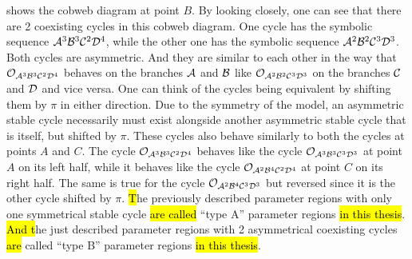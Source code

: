  shows the cobweb diagram at point $B$.
By looking closely, one can see that there are 2 coexisting cycles in this cobweb diagram.
One cycle has the symbolic sequence $\mathcal{A}^3\mathcal{B}^3\mathcal{C}^2\mathcal{D}^4$, while the other one has the symbolic sequence $\mathcal{A}^2\mathcal{B}^2\mathcal{C}^3\mathcal{D}^3$.
Both cycles are asymmetric.
And they are similar to each other in the way that $\mathcal{O}_{\mathcal{A}^3\mathcal{B}^3\mathcal{C}^2\mathcal{D}^4}$ behaves on the branches $\mathcal{A}$ and $\mathcal{B}$ like $\mathcal{O}_{\mathcal{A}^2\mathcal{B}^2\mathcal{C}^3\mathcal{D}^3}$ on the branches $\mathcal{C}$ and $\mathcal{D}$ and vice versa.
One can think of the cycles being equivalent by shifting them by $\pi$ in either direction.
Due to the symmetry of the model, an asymmetric stable cycle necessarily must exist alongside another asymmetric stable cycle that is itself, but shifted by $\pi$.
These cycles also behave similarly to both the cycles at points $A$ and $C$.
The cycle $\mathcal{O}_{\mathcal{A}^3\mathcal{B}^3\mathcal{C}^2\mathcal{D}^4}$ behaves like the cycle $\mathcal{O}_{\mathcal{A}^3\mathcal{B}^3\mathcal{C}^3\mathcal{D}^3}$ at point $A$ on its left half, while it behaves like the cycle $\mathcal{O}_{\mathcal{A}^2\mathcal{B}^4\mathcal{C}^2\mathcal{D}^4}$ at point $C$ on its right half.
The same is true for the cycle $\mathcal{O}_{\mathcal{A}^2\mathcal{B}^4\mathcal{C}^3\mathcal{D}^3}$ but reversed since it is the other cycle shifted by $\pi$.
\hl{T}he previously described parameter regions with only one symmetrical stable cycle \hl{are called} ``type A'' parameter regions \hl{in this thesis}.
\hl{And t}he just described parameter regions with 2 asymmetrical coexisting cycles \hl{are} called ``type B'' parameter regions \hl{in this thesis}.

